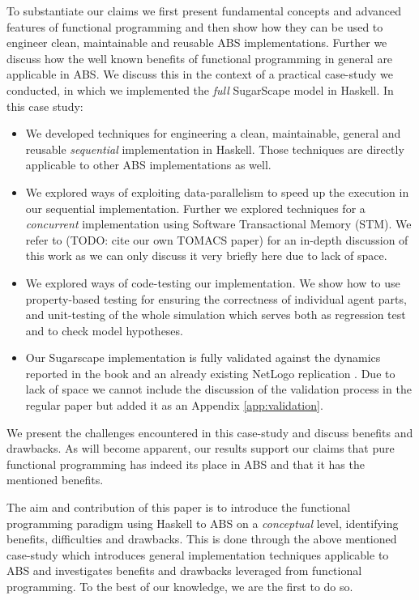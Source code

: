 To substantiate our claims we first present fundamental concepts and advanced features of functional programming and then show how they can be used to engineer clean, maintainable and reusable ABS implementations. Further we discuss how the well known benefits of functional programming in general are applicable in ABS. We discuss this in the context of a practical case-study we conducted, in which we implemented the \textit{full} SugarScape model \cite{epstein_growing_1996} in Haskell. In this case study:
\begin{itemize}
	\item We developed techniques for engineering a clean, maintainable, general and reusable \textit{sequential} implementation in Haskell. Those techniques are directly applicable to other ABS implementations as well.
	
	\item We explored ways of exploiting data-parallelism to speed up the execution in our sequential implementation. Further we explored techniques for a \textit{concurrent} implementation using Software Transactional Memory (STM). We refer to (TODO: cite our own TOMACS paper) for an in-depth discussion of this work as we can only discuss it very briefly here due to lack of space.
	
	\item We explored ways of code-testing our implementation. We show how to use property-based testing for ensuring the correctness of individual agent parts, and unit-testing of the whole simulation which serves both as regression test and to check model hypotheses.
	
	\item Our Sugarscape implementation is fully validated against the dynamics reported in the book \cite{epstein_growing_1996} and an already existing NetLogo replication \cite{weaver_replicating_nodate}. Due to lack of space we cannot include the discussion of the validation process in the regular paper but added it as an Appendix \ref{app:validation}.
\end{itemize}

We present the challenges encountered in this case-study and discuss benefits and drawbacks. As will become apparent, our results support our claims that pure functional programming has indeed its place in ABS and that it has the mentioned benefits. 

The aim and contribution of this paper is to introduce the functional programming paradigm using Haskell to ABS on a \textit{conceptual} level, identifying benefits, difficulties and drawbacks. This is done through the above mentioned case-study which introduces general implementation techniques applicable to ABS and investigates benefits and drawbacks leveraged from functional programming. To the best of our knowledge, we are the first to do so.

